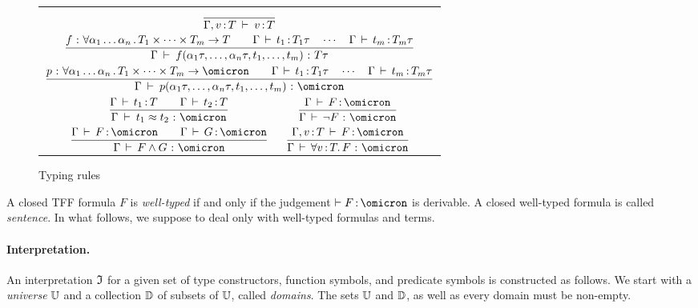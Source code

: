 \begin{figure}
\begin{center}
\begin{tabular}{c@{\qquad\qquad}c}
\multicolumn{2}{c}{$\displaystyle
\frac{}{\Gamma, v \operatorname{:} T \:\vdash\: v \operatorname{:} T}$} \\[4ex]
\multicolumn{2}{c}{$\displaystyle
\frac{f \,\operatorname{:}\, \forall \alpha_1\dots\alpha_n \,.\,
    T_1 \times \dots \times T_m \to T
\qquad
\Gamma \,\vdash\, t_1 \operatorname{:} T_1\tau
\quad\cdots\quad
\Gamma \,\vdash\, t_m \operatorname{:} T_m\tau
}{\Gamma \:\vdash\:
f(\alpha_1\tau,\dots,\alpha_n\tau,t_1,\dots,t_m) \,\operatorname{:}\, T\tau}
$} \\[4ex]
\multicolumn{2}{c}{$\displaystyle
\frac{p \,\ty\, \forall \alpha_1\dots\alpha_n \,.\,
    T_1 \times \dots \times T_m \to \omicron
\qquad
\Gamma \,\vdash\, t_1 \ty T_1\tau
\quad\cdots\quad
\Gamma \,\vdash\, t_m \ty T_m\tau
}{\Gamma \:\vdash\:
p(\alpha_1\tau,\dots,\alpha_n\tau,t_1,\dots,t_m) \,\ty\, \omicron}
$} \\[4ex]
$\qquad\displaystyle
\frac{\Gamma \,\vdash\, t_1 \ty T \qquad \Gamma \,\vdash\, t_2 \ty T}{
\Gamma \:\vdash\: t_1 \approx t_2 \,\ty\, \omicron}$ &
$\displaystyle
\frac{\Gamma \,\vdash\, F \ty \omicron}{
\Gamma \,\vdash\, \lnot F \,\ty\, \omicron}\qquad$ \\[4ex]
$\qquad\displaystyle
\frac{\Gamma \,\vdash\, F \ty \omicron \qquad
\Gamma \,\vdash\, G \ty \omicron}{
\Gamma \,\vdash\, F \land G \,\ty\, \omicron}$ &
$\displaystyle
\frac{\Gamma, v \ty T \,\vdash\, F \ty \omicron}{
\Gamma \,\vdash\, \forall v \ty T .\, F \,\ty\, \omicron}\qquad$
\end{tabular}
\end{center}
\caption{Typing rules}
\label{fig:typing}
\end{figure}

A closed TFF formula $F$ is {\em well-typed\/} if and only if
the judgement $\vdash F \ty \omicron$ is derivable. A closed
well-typed formula is called {\em sentence}. In what follows,
we suppose to deal only with well-typed formulas and terms.

\paragraph{Interpretation.}
An interpretation $\mathfrak{I}$ for a given set of type constructors,
function symbols, and predicate symbols is constructed as follows.
We start with a {\em universe\/} $\mathbb{U}$ and a collection $\mathbb{D}$
of subsets of $\mathbb{U}$, called {\em domains}. The sets $\mathbb{U}$ and
$\mathbb{D}$, as well as every domain must be non-empty.

